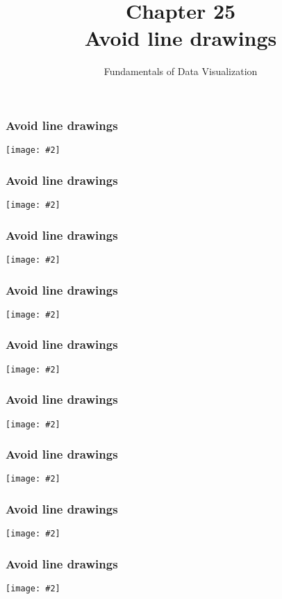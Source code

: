 \documentclass{beamer}
\author{Fundamentals of Data Visualization}
\title{Chapter 25\\Avoid line drawings}
\newcommand{\fig}[2]{\centerline{\texttt{[image: \#2]}}}
\newcommand{\bfr}[1]{\begin{frame}[fragile]\frametitle{{ #1 }}}
\begin{document}
\begin{frame}
\maketitle
\end{frame}

\bfr{Avoid line drawings}
\fig{1}{titanic-ages-lines-1.png}
\end{frame}
\bfr{Avoid line drawings}
\fig{1}{titanic-ages-filled-1.png}
\end{frame}
\bfr{Avoid line drawings}
\fig{1}{iris-densities-lines-1.png}
\end{frame}
\bfr{Avoid line drawings}
\fig{1}{iris-densities-colored-lines-1.png}
\end{frame}
\bfr{Avoid line drawings}
\fig{1}{iris-densities-filled-1.png}
\end{frame}
\bfr{Avoid line drawings}
\fig{1}{mpg-linespoints-1.png}
\end{frame}
\bfr{Avoid line drawings}
\fig{1}{mpg-filledpoints-1.png}
\end{frame}
\bfr{Avoid line drawings}
\fig{1}{lincoln-weather-box-empty-1.png}
\end{frame}
\bfr{Avoid line drawings}
\fig{1}{lincoln-weather-box-filled-1.png}
\end{frame}
\end{document}
